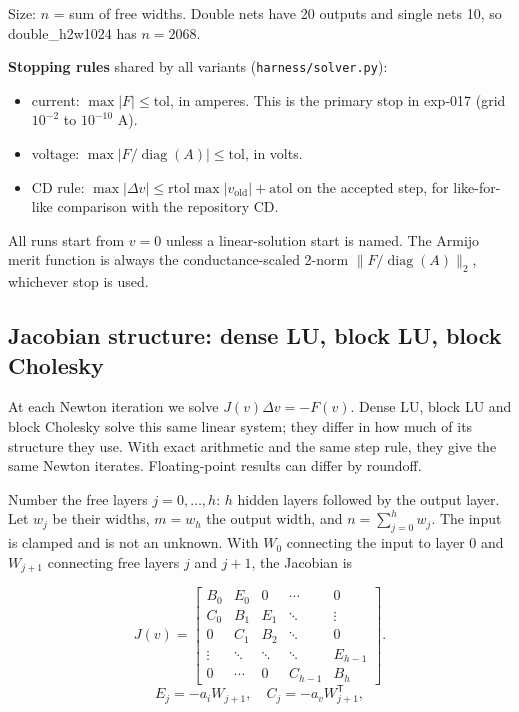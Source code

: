 \documentclass[11pt,a4paper]{article}
\begin{document}
Size: $n$ = sum of free widths. Double nets have 20 outputs and single nets 10, so
double\_h2w1024 has $n=2068$.

\textbf{Stopping rules} shared by all variants (\nolinkurl{harness/solver.py}):

\begin{itemize}
\item current: $\max|F|\leq\mathrm{tol}$, in amperes. This is the primary stop in exp-017
(grid $10^{-2}$ to $10^{-10}$ A).
\item voltage: $\max|F/\operatorname{diag}(A)|\leq\mathrm{tol}$, in volts.
\item CD rule: $\max|\Delta v|\leq\mathrm{rtol}\max|v_{\mathrm{old}}|+\mathrm{atol}$ on the
accepted step, for like-for-like comparison with the repository CD.
\end{itemize}

All runs start from $v=0$ unless a linear-solution start is named. The Armijo merit
function is always the conductance-scaled 2-norm $\|F/\operatorname{diag}(A)\|_2$,
whichever stop is used.

\subsection*{Jacobian structure: dense LU, block LU, block Cholesky}

At each Newton iteration we solve $J(v)\Delta v=-F(v)$. Dense LU, block LU and block
Cholesky solve this same linear system; they differ in how much of its structure they
use. With exact arithmetic and the same step rule, they give the same Newton iterates.
Floating-point results can differ by roundoff.

Number the free layers $j=0,\ldots,h$: $h$ hidden layers followed by the output layer.
Let $w_{j}$ be their widths, $m=w_h$ the output width, and $n=\sum_{j=0}^{h}w_j$.
The input is clamped and is not an unknown. With $W_{0}$ connecting the input to layer 0
and $W_{j+1}$ connecting free layers $j$ and $j+1$, the Jacobian is

\[
J(v) =
\begin{bmatrix}
B_0 & E_0 & 0 & \cdots & 0 \\
C_0 & B_1 & E_1 & \ddots & \vdots \\
0 & C_1 & B_2 & \ddots & 0 \\
\vdots & \ddots & \ddots & \ddots & E_{h-1} \\
0 & \cdots & 0 & C_{h-1} & B_h
\end{bmatrix}.
\]
\[
E_j = -a_i W_{j+1}, \quad C_j = -a_v W_{j+1}^{\mathsf T},
\]
\end{document}
